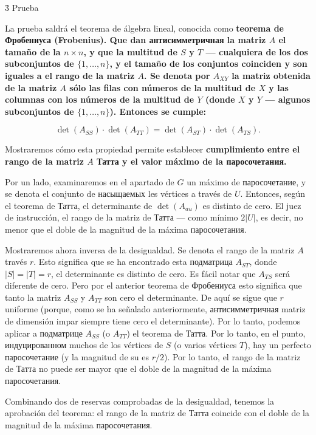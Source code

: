 \h3{ Prueba }

La prueba saldrá el teorema de álgebra lineal, conocida como \bf{teorema de Фробениуса} (Frobenius). Que dan антисимметричная la matriz $A$ el tamaño de la $n \times n$, y que la multitud de $S$ y $T$ --- cualquiera de los dos subconjuntos de $\{ 1, \ldots, n \}$, y el tamaño de los conjuntos coinciden y son iguales a el rango de la matriz $A$. Se denota por $A_{XY}$ la matriz obtenida de la matriz $A$ sólo las filas con números de la multitud de $X$ y las columnas con los números de la multitud de $Y$ (donde $X$ y $Y$ --- algunos subconjuntos de $\{ 1, \ldots, n \}$). Entonces se cumple:

$$ \det(A_{SS}) \cdot \det(A_{TT}) = \det(A_{ST}) \cdot \det(A_{TS}). $$

Mostraremos cómo esta propiedad permite establecer \bf{cumplimiento} entre el rango de la matriz $A$ Татта y el valor máximo de la паросочетания.

Por un lado, examinaremos en el apartado de $G$ un máximo de паросочетание, y se denota el conjunto de насыщаемых les vértices a través de $U$. Entonces, según el teorema de Татта, el determinante de $\det(A_{au})$ es distinto de cero. El juez de instrucción, el rango de la matriz de Татта --- como mínimo $2|U|$, es decir, no menor que el doble de la magnitud de la máxima паросочетания.

Mostraremos ahora inversa de la desigualdad. Se denota el rango de la matriz $A$ través $r$. Esto significa que se ha encontrado esta подматрица $A_{ST}$, donde $|S| = |T| = r$, el determinante es distinto de cero. Es fácil notar que $A_{TS}$ será diferente de cero. Pero por el anterior teorema de Фробениуса esto significa que tanto la matriz $A_{SS}$ y $A_{TT}$ son cero el determinante. De aquí se sigue que $r$ uniforme (porque, como se ha señalado anteriormente, антисимметричная matriz de dimensión impar siempre tiene cero el determinante). Por lo tanto, podemos aplicar a подматрице $A_{SS}$ (o $A_{TT}$) el teorema de Татта. Por lo tanto, en el punto, индуцированном muchos de los vértices de $S$ (o varios vértices $T$), hay un perfecto паросочетание (y la magnitud de su es $r/2$). Por lo tanto, el rango de la matriz de Татта no puede ser mayor que el doble de la magnitud de la máxima паросочетания.

Combinando dos de reservas comprobadas de la desigualdad, tenemos la aprobación del teorema: el rango de la matriz de Татта coincide con el doble de la magnitud de la máxima паросочетания.



